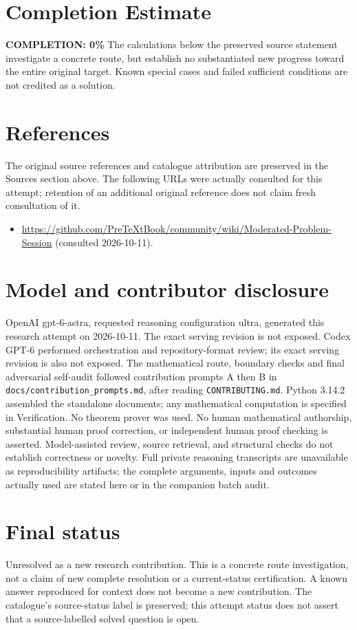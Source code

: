 \documentclass[11pt]{article}
\begin{document}
\section{Completion Estimate}
\noindent\textbf{COMPLETION: 0\%}
The calculations below the preserved source statement investigate a concrete route,
but establish no substantiated new progress toward the entire original target.
Known special cases and failed sufficient conditions are not credited as a solution.
\section{References}
The original source references and catalogue attribution are preserved in the
Sources section above. The following URLs were actually consulted for this attempt;
retention of an additional original reference does not claim fresh consultation of it.
\begin{itemize}
\item \url{https://github.com/PreTeXtBook/community/wiki/Moderated-Problem-Session} (consulted 2026-10-11). 
\end{itemize}
\section{Model and contributor disclosure}
OpenAI gpt-6-astra, requested reasoning configuration ultra, generated this research
attempt on 2026-10-11. The exact serving revision is not exposed. Codex GPT-6
performed orchestration and repository-format review; its exact serving revision
is also not exposed. The mathematical route, boundary checks and final adversarial
self-audit followed contribution prompts A then B in
\texttt{docs/contribution\_prompts.md}, after reading \texttt{CONTRIBUTING.md}.
Python 3.14.2 assembled the standalone documents; any mathematical computation is
specified in Verification. No theorem prover was used. No human mathematical
authorship, substantial human proof correction, or independent human proof checking
is asserted. Model-assisted review, source retrieval, and structural checks do not
establish correctness or novelty. Full private reasoning transcripts are unavailable
as reproducibility artifacts; the complete arguments, inputs and outcomes actually
used are stated here or in the companion batch audit.
\section{Final status}
Unresolved as a new research contribution. This is a concrete route investigation,
not a claim of new complete resolution or a current-status certification. A known
answer reproduced for context does not become a new contribution. The catalogue's
source-status label is preserved; this attempt status does not assert that a
source-labelled solved question is open.
\end{document}
